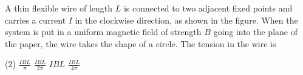 
\item A thin flexible wire of length \( L \) is connected to two adjacent fixed points and carries a current \( I \) in the clockwise direction, as shown in the figure. When the system is put in a uniform magnetic field of strength \( B \) going into the plane of the paper, the wire takes the shape of a circle. The tension in the wire is
    \begin{center}
    \end{center}
    \begin{tasks}(2)
        \task \( \frac{IBL}{\pi} \)
        \task \( \frac{IBL}{2\pi} \)
        \task \( IBL \)
        \task \( \frac{IBL}{4\pi} \)
    \end{tasks}
